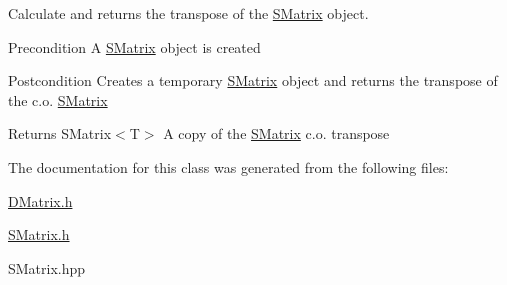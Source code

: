Calculate and returns the transpose of the \mbox{\hyperlink{class_s_matrix}{S\+Matrix}} object. 

\begin{DoxyPrecond}{Precondition}
A \mbox{\hyperlink{class_s_matrix}{S\+Matrix}} object is created 
\end{DoxyPrecond}
\begin{DoxyPostcond}{Postcondition}
Creates a temporary \mbox{\hyperlink{class_s_matrix}{S\+Matrix}} object and returns the transpose of the c.\+o. \mbox{\hyperlink{class_s_matrix}{S\+Matrix}} 
\end{DoxyPostcond}
\begin{DoxyReturn}{Returns}
S\+Matrix$<$\+T$>$ A copy of the \mbox{\hyperlink{class_s_matrix}{S\+Matrix}} c.\+o. transpose 
\end{DoxyReturn}


The documentation for this class was generated from the following files\+:\begin{DoxyCompactItemize}
\item 
\mbox{\hyperlink{_d_matrix_8h}{D\+Matrix.\+h}}\item 
\mbox{\hyperlink{_s_matrix_8h}{S\+Matrix.\+h}}\item 
S\+Matrix.\+hpp\end{DoxyCompactItemize}
